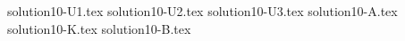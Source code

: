 \documentclass{article}
\begin{document}
{solution10-U1.tex}
{solution10-U2.tex}
{solution10-U3.tex}
{solution10-A.tex}
{solution10-K.tex}
{solution10-B.tex}
\end{document}
